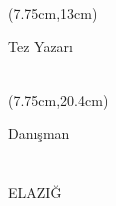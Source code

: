 
\begin{titlepage}

\centering

\begin{small}
	\textbf{\antet\\}
\end{small}


\vspace*{0.35cm}
\vspace*{2.99cm}
\derece
\vspace*{2.1cm}\\

\begin{spacing}{1.25}
\begin{Large}
\bfseries\tezbasligi\\
\end{Large}
\end{spacing}

\begin{textblock*}{6.5cm}(7.75cm,13cm) %
\begin{center}

\vspace{1cm}
\normalsize{Tez Yazarı}\\
\vspace{0.3cm}
\textbf{\tezyazari}\\
\end{center}
\end{textblock*}

\begin{textblock*}{6.5cm}(7.75cm,20.4cm) %
\begin{center}
\normalsize{Danışman}\\
\vspace{0.2cm}
\danisman\\
\vspace{0.80cm}
\vspace{0.2cm}
\vspace{2.1cm}
\ay\: \yil \\ ELAZIĞ \\
\end{center}
\end{textblock*}

\end{titlepage}
\restoregeometry

\newpage
